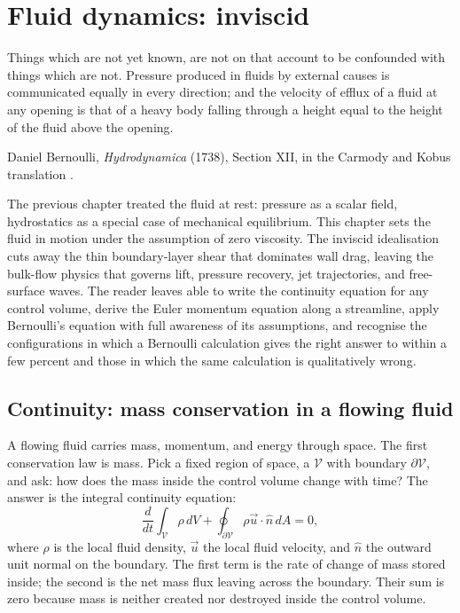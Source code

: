\chapter{Fluid dynamics: inviscid}
\label{vol03:ch11}

\epigraph{Things which are not yet known, are not on that account
to be confounded with things which are not. Pressure produced in
fluids by external causes is communicated equally in every
direction; and the velocity of efflux of a fluid at any opening is
that of a heavy body falling through a height equal to the height
of the fluid above the opening.}{Daniel Bernoulli, \emph{
Hydrodynamica} (1738), Section XII, in the Carmody and Kobus
translation \cite[pp.~244--245]{hist:bernoulli1738}.}


\noindent
The previous chapter treated the fluid at rest: pressure as a
scalar field, hydrostatics as a special case of mechanical
equilibrium. This chapter sets the fluid in motion under the
assumption of zero viscosity. The inviscid idealisation cuts away
the thin boundary-layer shear that dominates wall drag, leaving the
bulk-flow physics that governs lift, pressure recovery, jet
trajectories, and free-surface waves. The reader leaves able to
write the continuity equation for any control volume, derive the
Euler momentum equation along a streamline, apply Bernoulli's
equation with full awareness of its assumptions, and recognise the
configurations in which a Bernoulli calculation gives the right
answer to within a few percent and those in which the same
calculation is qualitatively wrong.

\section{Continuity: mass conservation in a flowing fluid}

A flowing fluid carries mass, momentum, and energy through space.
The first conservation law is mass. Pick a fixed region of space,
a  $\mathcal{V}$ with boundary
$\partial\mathcal{V}$, and ask: how does the mass inside the
control volume change with time? The answer is the integral
continuity equation:
\[
\frac{d}{dt}\int_{\mathcal{V}} \rho \,dV
+ \oint_{\partial\mathcal{V}} \rho \vec{u} \cdot \hat{n}\,dA = 0,
\]
where $\rho$ is the local fluid density, $\vec{u}$ the local fluid
velocity, and $\hat{n}$ the outward unit normal on the boundary.
The first term is the rate of change of mass stored inside; the
second is the net mass flux leaving across the boundary. Their sum
is zero because mass is neither created nor destroyed inside the
control volume.

